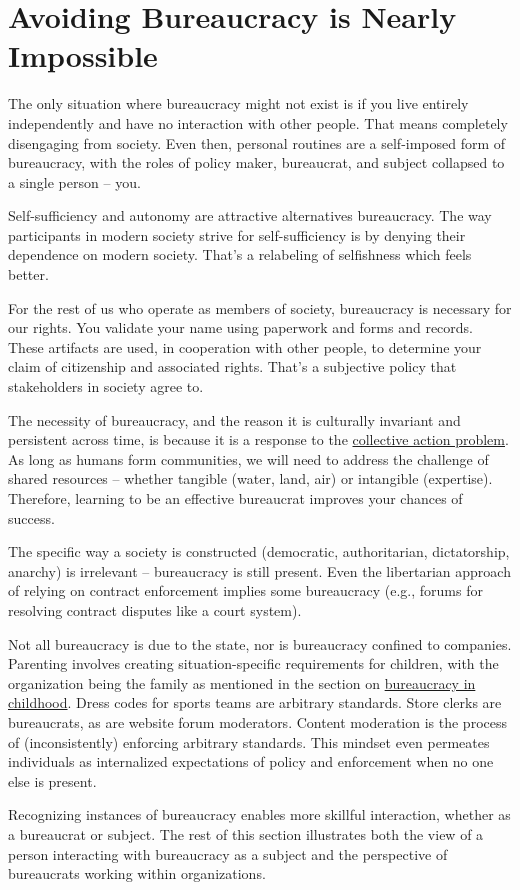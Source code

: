 \section{Avoiding Bureaucracy is Nearly Impossible}

The only situation where bureaucracy might not exist is if you live entirely independently and have no interaction with other people. That means completely disengaging from society. Even then, personal routines are a self-imposed form of bureaucracy, with the roles of policy maker, bureaucrat, and subject collapsed to a single person -- you.

Self-sufficiency and autonomy are attractive alternatives bureaucracy. The way participants in modern society strive for self-sufficiency is by denying their dependence on modern society. That's a relabeling of selfishness which feels better. 

For the rest of us who operate as members of  society, bureaucracy is necessary for our rights. You validate your name using paperwork and forms and records. These artifacts are used, in cooperation with other people, to determine your claim of citizenship and associated rights. That's a subjective policy that \glspl{stakeholder} in society agree to. 

The necessity of bureaucracy, and the reason it is culturally invariant and persistent across time, is because it is a response to the 
\href{https://en.wikipedia.org/wiki/Collective_action_problem}{collective action problem}. 
As long as humans form communities, we will need to address the challenge of \glspl{shared resource} -- whether tangible (water, land, air) or intangible (expertise). Therefore, learning to be an effective bureaucrat improves your chances of success. 

The specific way a society is constructed (democratic, authoritarian, dictatorship, anarchy) is irrelevant -- bureaucracy is still present. Even the libertarian approach of relying on contract enforcement implies some bureaucracy (e.g., forums for resolving contract disputes like a court system). 


Not all bureaucracy is due to the state, nor is bureaucracy confined to companies. Parenting involves creating situation-specific requirements for children, with the organization being the family as mentioned in the section 
on \hyperref[sec:bureaucracy-early-childhood]{bureaucracy in childhood}.
Dress codes for sports teams are arbitrary standards. 
Store clerks are bureaucrats, as are website forum moderators.  Content moderation is the process of (inconsistently) enforcing arbitrary standards. This mindset even permeates individuals as internalized expectations of policy and enforcement when no one else is present. 

Recognizing instances of bureaucracy enables more skillful interaction, whether as a bureaucrat or subject. The rest of this section illustrates both the view of a person interacting with bureaucracy as a \gls{subject} and the perspective of bureaucrats working within organizations. 




